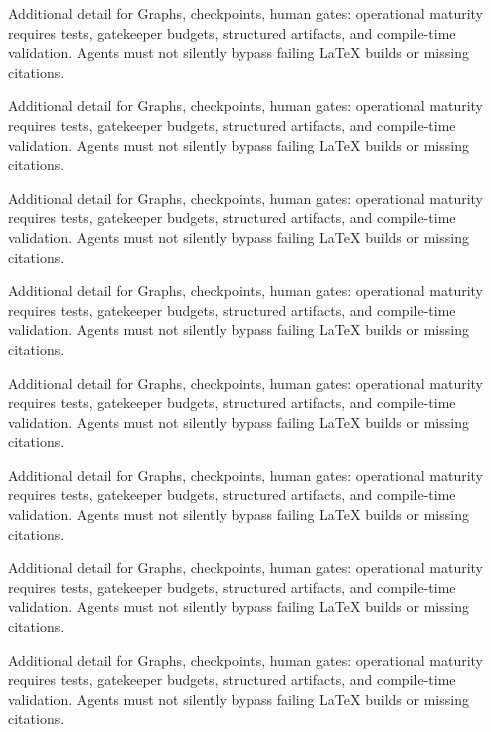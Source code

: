 Additional detail for Graphs, checkpoints, human gates: operational maturity requires tests, gatekeeper budgets, structured artifacts, and compile-time validation. Agents must not silently bypass failing LaTeX builds or missing citations. \cite{crewai2024} \cite{langgraph2024} \cite{mcp2024}

Additional detail for Graphs, checkpoints, human gates: operational maturity requires tests, gatekeeper budgets, structured artifacts, and compile-time validation. Agents must not silently bypass failing LaTeX builds or missing citations. \cite{crewai2024} \cite{langgraph2024} \cite{mcp2024}

Additional detail for Graphs, checkpoints, human gates: operational maturity requires tests, gatekeeper budgets, structured artifacts, and compile-time validation. Agents must not silently bypass failing LaTeX builds or missing citations. \cite{crewai2024} \cite{langgraph2024} \cite{mcp2024}

Additional detail for Graphs, checkpoints, human gates: operational maturity requires tests, gatekeeper budgets, structured artifacts, and compile-time validation. Agents must not silently bypass failing LaTeX builds or missing citations. \cite{crewai2024} \cite{langgraph2024} \cite{mcp2024}

Additional detail for Graphs, checkpoints, human gates: operational maturity requires tests, gatekeeper budgets, structured artifacts, and compile-time validation. Agents must not silently bypass failing LaTeX builds or missing citations. \cite{crewai2024} \cite{langgraph2024} \cite{mcp2024}

Additional detail for Graphs, checkpoints, human gates: operational maturity requires tests, gatekeeper budgets, structured artifacts, and compile-time validation. Agents must not silently bypass failing LaTeX builds or missing citations. \cite{crewai2024} \cite{langgraph2024} \cite{mcp2024}

Additional detail for Graphs, checkpoints, human gates: operational maturity requires tests, gatekeeper budgets, structured artifacts, and compile-time validation. Agents must not silently bypass failing LaTeX builds or missing citations. \cite{crewai2024} \cite{langgraph2024} \cite{mcp2024}

Additional detail for Graphs, checkpoints, human gates: operational maturity requires tests, gatekeeper budgets, structured artifacts, and compile-time validation. Agents must not silently bypass failing LaTeX builds or missing citations. \cite{crewai2024} \cite{langgraph2024} \cite{mcp2024}

